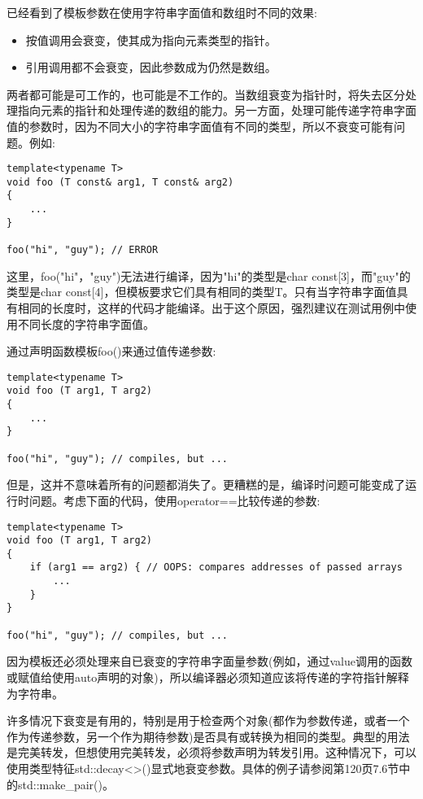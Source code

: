 
已经看到了模板参数在使用字符串字面值和数组时不同的效果:

\begin{itemize}
\item 
按值调用会衰变，使其成为指向元素类型的指针。

\item 
引用调用都不会衰变，因此参数成为仍然是数组。
\end{itemize}

两者都可能是可工作的，也可能是不工作的。当数组衰变为指针时，将失去区分处理指向元素的指针和处理传递的数组的能力。另一方面，处理可能传递字符串字面值的参数时，因为不同大小的字符串字面值有不同的类型，所以不衰变可能有问题。例如:

\begin{lstlisting}[style=styleCXX]
template<typename T>
void foo (T const& arg1, T const& arg2)
{
	...
}

foo("hi", "guy"); // ERROR
\end{lstlisting}

这里，foo("hi"，"guy")无法进行编译，因为"hi"的类型是char const[3]，而"guy"的类型是char const[4]，但模板要求它们具有相同的类型T。只有当字符串字面值具有相同的长度时，这样的代码才能编译。出于这个原因，强烈建议在测试用例中使用不同长度的字符串字面值。

通过声明函数模板foo()来通过值传递参数:

\begin{lstlisting}[style=styleCXX]
template<typename T>
void foo (T arg1, T arg2)
{
	...
}

foo("hi", "guy"); // compiles, but ...
\end{lstlisting}

但是，这并不意味着所有的问题都消失了。更糟糕的是，编译时问题可能变成了运行时问题。考虑下面的代码，使用operator==比较传递的参数:

\begin{lstlisting}[style=styleCXX]
template<typename T>
void foo (T arg1, T arg2)
{
	if (arg1 == arg2) { // OOPS: compares addresses of passed arrays
		...
	}
}

foo("hi", "guy"); // compiles, but ...
\end{lstlisting}

因为模板还必须处理来自已衰变的字符串字面量参数(例如，通过value调用的函数或赋值给使用auto声明的对象)，所以编译器必须知道应该将传递的字符指针解释为字符串。

许多情况下衰变是有用的，特别是用于检查两个对象(都作为参数传递，或者一个作为传递参数，另一个作为期待参数)是否具有或转换为相同的类型。典型的用法是完美转发，但想使用完美转发，必须将参数声明为转发引用。这种情况下，可以使用类型特征std::decay<>()显式地衰变参数。具体的例子请参阅第120页7.6节中的std::make\_pair()。

